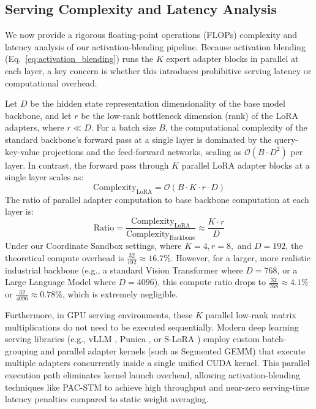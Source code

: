 \subsection{Serving Complexity and Latency Analysis}
\label{subsec:complexity_latency}
We now provide a rigorous floating-point operations (FLOPs) complexity and latency analysis of our activation-blending pipeline. Because activation blending (Eq.~\ref{eq:activation_blending}) runs the $K$ expert adapter blocks in parallel at each layer, a key concern is whether this introduces prohibitive serving latency or computational overhead.

Let $D$ be the hidden state representation dimensionality of the base model backbone, and let $r$ be the low-rank bottleneck dimension (rank) of the LoRA adapters, where $r \ll D$. For a batch size $B$, the computational complexity of the standard backbone's forward pass at a single layer is dominated by the query-key-value projections and the feed-forward networks, scaling as $\mathcal{O}(B \cdot D^2)$ per layer. In contrast, the forward pass through $K$ parallel LoRA adapter blocks at a single layer scales as:
\begin{equation}
\text{Complexity}_{\text{LoRA}} = \mathcal{O}(B \cdot K \cdot r \cdot D)
\end{equation}
The ratio of parallel adapter computation to base backbone computation at each layer is:
\begin{equation}
\text{Ratio} = \frac{\text{Complexity}_{\text{LoRA}}}{\text{Complexity}_{\text{Backbone}}} \approx \frac{K \cdot r}{D}
\end{equation}
Under our Coordinate Sandbox settings, where $K = 4, r = 8,$ and $D = 192$, the theoretical compute overhead is $\frac{32}{192} \approx 16.7\%$. However, for a larger, more realistic industrial backbone (e.g., a standard Vision Transformer where $D = 768$, or a Large Language Model where $D = 4096$), this compute ratio drops to $\frac{32}{768} \approx 4.1\%$ or $\frac{32}{4096} \approx 0.78\%$, which is extremely negligible.

Furthermore, in GPU serving environments, these $K$ parallel low-rank matrix multiplications do not need to be executed sequentially. Modern deep learning serving libraries (e.g., vLLM \cite{kwon2023vllm}, Punica \cite{punica2023}, or S-LoRA \cite{slora2024}) employ custom batch-grouping and parallel adapter kernels (such as Segmented GEMM) that execute multiple adapters concurrently inside a single unified CUDA kernel. This parallel execution path eliminates kernel launch overhead, allowing activation-blending techniques like PAC-STM to achieve high throughput and near-zero serving-time latency penalties compared to static weight averaging. 

